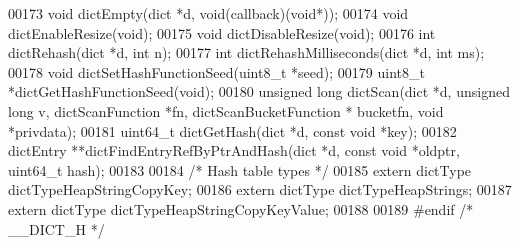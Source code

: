 \begin{DoxyCode}
00173 \textcolor{keywordtype}{void} dictEmpty(dict *d, \textcolor{keywordtype}{void}(callback)(\textcolor{keywordtype}{void}*));
00174 \textcolor{keywordtype}{void} dictEnableResize(\textcolor{keywordtype}{void});
00175 \textcolor{keywordtype}{void} dictDisableResize(\textcolor{keywordtype}{void});
00176 \textcolor{keywordtype}{int} dictRehash(dict *d, \textcolor{keywordtype}{int} n);
00177 \textcolor{keywordtype}{int} dictRehashMilliseconds(dict *d, \textcolor{keywordtype}{int} ms);
00178 \textcolor{keywordtype}{void} dictSetHashFunctionSeed(uint8\_t *seed);
00179 uint8\_t *dictGetHashFunctionSeed(\textcolor{keywordtype}{void});
00180 \textcolor{keywordtype}{unsigned} \textcolor{keywordtype}{long} dictScan(dict *d, \textcolor{keywordtype}{unsigned} \textcolor{keywordtype}{long} v, dictScanFunction *fn, dictScanBucketFunction *
      bucketfn, \textcolor{keywordtype}{void} *privdata);
00181 uint64\_t dictGetHash(dict *d, \textcolor{keyword}{const} \textcolor{keywordtype}{void} *key);
00182 dictEntry **dictFindEntryRefByPtrAndHash(dict *d, \textcolor{keyword}{const} \textcolor{keywordtype}{void} *oldptr, uint64\_t hash);
00183 
00184 \textcolor{comment}{/* Hash table types */}
00185 \textcolor{keyword}{extern} dictType dictTypeHeapStringCopyKey;
00186 \textcolor{keyword}{extern} dictType dictTypeHeapStrings;
00187 \textcolor{keyword}{extern} dictType dictTypeHeapStringCopyKeyValue;
00188 
00189 \textcolor{preprocessor}{#}\textcolor{preprocessor}{endif} \textcolor{comment}{/* \_\_DICT\_H */}
\end{DoxyCode}
